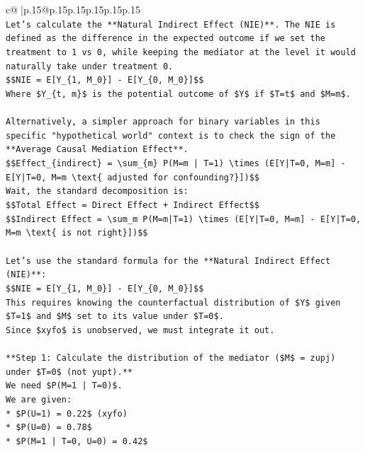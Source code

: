 \documentclass{article}
\begin{document}
{\begin{supertabular}{c@{$\;$}|p{.15\linewidth}@{}p{.15\linewidth}p{.15\linewidth}p{.15\linewidth}p{.15\linewidth}p{.15\linewidth}}
{{{\\ 
\texttt{Let's calculate the **Natural Indirect Effect (NIE)**. The NIE is defined as the difference in the expected outcome if we set the treatment to 1 vs 0, while keeping the mediator at the level it would naturally take under treatment 0.} \\
\texttt{\$\$NIE = E{[}Y\_\{1, M\_0\}{]} {-} E{[}Y\_\{0, M\_0\}{]}\$\$} \\
\texttt{Where \$Y\_\{t, m\}\$ is the potential outcome of \$Y\$ if \$T=t\$ and \$M=m\$.} \\
\\ 
\texttt{Alternatively, a simpler approach for binary variables in this specific "hypothetical world" context is to check the sign of the **Average Causal Mediation Effect**.} \\
\texttt{\$\$Effect\_\{indirect\} = \textbackslash{}sum\_\{m\} P(M=m | T=1) \textbackslash{}times (E{[}Y|T=0, M=m{]} {-} E{[}Y|T=0, M=m \textbackslash{}text\{ adjusted for confounding?\}{]})\$\$} \\
\texttt{Wait, the standard decomposition is:} \\
\texttt{\$\$Total Effect = Direct Effect + Indirect Effect\$\$} \\
\texttt{\$\$Indirect Effect = \textbackslash{}sum\_m P(M=m|T=1) \textbackslash{}times (E{[}Y|T=0, M=m{]} {-} E{[}Y|T=0, M=m \textbackslash{}text\{ is not right\}{]})\$\$} \\
\\ 
\texttt{Let's use the standard formula for the **Natural Indirect Effect (NIE)**:} \\
\texttt{\$\$NIE = E{[}Y\_\{1, M\_0\}{]} {-} E{[}Y\_\{0, M\_0\}{]}\$\$} \\
\texttt{This requires knowing the counterfactual distribution of \$Y\$ given \$T=1\$ and \$M\$ set to its value under \$T=0\$.} \\
\texttt{Since \$xyfo\$ is unobserved, we must integrate it out.} \\
\\ 
\texttt{**Step 1: Calculate the distribution of the mediator (\$M\$ = zupj) under \$T=0\$ (not yupt).**} \\
\texttt{We need \$P(M=1 | T=0)\$.} \\
\texttt{We are given:} \\
\texttt{*   \$P(U=1) = 0.22\$ (xyfo)} \\
\texttt{*   \$P(U=0) = 0.78\$} \\
\texttt{*   \$P(M=1 | T=0, U=0) = 0.42\$} \\
}}}
\end{supertabular}}
\end{document}
